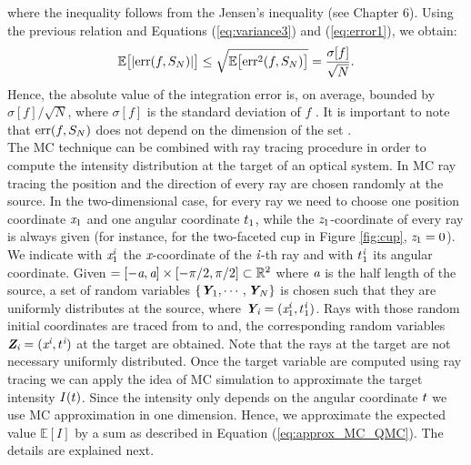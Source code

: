 where the inequality follows from the Jensen's inequality (see \cite{williams1991probability} Chapter $6$).
Using the previous relation and Equations (\ref{eq:variance3}) and (\ref{eq:error1}), we obtain:
\begin{equation}\label{eq:mean_error}
\mathbb{E}\big[|\textrm{err}(f, S_{N})|\big]\leq
\sqrt{\mathbb{E}\big[\textrm{err}^2(f, S_{N})\big]} = \frac{\sigma[f]}{\sqrt{N}}.
\end{equation}
Hence, the absolute value of the integration error is, on average, bounded by $\sigma[f]/\sqrt{N}$, where $\sigma[f]$ is the standard deviation of $f$ \cite{leobacher2014introduction}. It is important to note that $\textrm{err}(f, S_{N})$ does not depend on the dimension of the set .
\\ \indent The MC technique can be combined with ray tracing procedure in order to compute the intensity distribution at the target of an optical system.
In MC ray tracing the position and the direction of every ray are chosen randomly at the source.
In the two-dimensional case, for every ray we need to choose one position coordinate $\textit{x}_1$ and one angular coordinate $t_1$, while the $\textit{z}_1$-coordinate of every ray is always given (for instance, for the two-faceted cup in Figure \ref{fig:cup}, $\textit{z}_1=0$). We indicate with $\textit{x}_{1}^{\textit{i}}$ the $\textit{x}$-coordinate of the $\textit{i}$-th ray and with $t_1^{\textit{i}}$ its angular coordinate. Given $=[-\textit{a}, \textit{a}]\times[-\pi/2, \pi/2]\subset\mathbb{R}^2$ where $\textit{a}$ is the half length of the source, a set of random variables $\{\textit{\textbf{Y}}_1, \cdots, \textit{\textbf{Y}}_N\}$ is chosen such that they are uniformly distributes at the source, where $\textit{\textbf{Y}}_{\textit{i}}= (\textit{x}_{1}^{\textit{i}},t_1^{\textit{i}})$.
Rays with those random initial coordinates are traced from  to  and, the corresponding random variables $\textit{\textbf{Z}}_{\textit{i}}=(\textit{x}^{\textit{i}},t^{\textit{i}})$ at the target are obtained. Note that the rays at the target are not necessary uniformly distributed. Once the target variable are computed using ray tracing we can apply the idea of MC simulation to approximate the target intensity $I(t)$. Since the intensity only depends on the angular coordinate $t$ we use MC approximation in one dimension. Hence, we approximate the expected value $\mathbb{E}[I]$ by a sum as described in Equation (\ref{eq:approx_MC_QMC}). The details are explained next.
